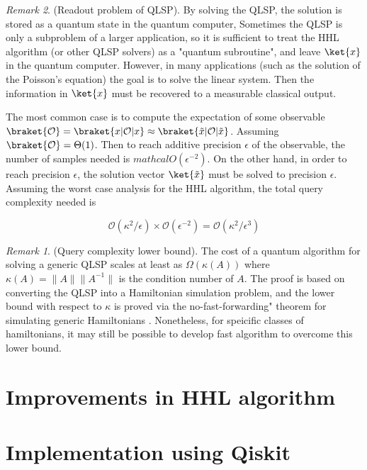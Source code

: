 \documentclass[12pt, oneside]{book}
\theoremstyle{definition}
\theoremstyle{definition}
\theoremstyle{remark}
\newtheorem*{remark}{Remark}
\begin{document}
\begin{remark}
    (Readout problem of QLSP). By solving the QLSP, the solution is stored as a quantum state in the quantum computer, Sometimes the QLSP is only a subproblem of a larger application, so it is sufficient to treat the HHL algorithm (or other QLSP solvers) as a "quantum subroutine", and leave $\ket{x}$ in the quantum computer. However, in many applications (such as the solution of the Poisson's equation) the goal is to solve the linear system. Then the information in $\ket{x}$ must be recovered to a measurable classical output.

    The most common case is to compute the expectation of some observable $\braket{\mathcal{O}}=\braket{x|\mathcal{O}|x}\approx \braket{\tilde{x}|\mathcal{O}|\tilde{x}}$. Assuming $\braket{\mathcal{O}}=\Theta(1)$. Then to reach additive precision $\epsilon$ of the observable, the number of samples needed is $mathcal{O}(\epsilon^{-2})$. On the other hand, in order to reach precision $\epsilon$, the solution vector $\ket{\tilde{x}}$ must be solved to precision $\epsilon$. Assuming the worst case analysis for the HHL algorithm, the total query complexity needed is
    
\[
\mathcal{O}(\kappa^2/\epsilon)\times \mathcal{O}(\epsilon^{-2})=\mathcal{O}(\kappa^2/\epsilon^3)
\]

\begin{remark}
    (Query complexity lower bound). The cost of a quantum algorithm for solving a generic QLSP scales at least as $\Omega(\kappa(A))$ where $\kappa(A)=\|A\|\|A^{-1}\|$ is the condition number of $A$. The proof is based on converting the QLSP into a Hamiltonian simulation problem, and the lower bound with respect to $\kappa$ is proved via the no-fast-forwarding" theorem for simulating generic Hamiltonians \cite{harrow2009quantum}. Nonetheless, for speicific classes of hamiltonians, it may still be possible to develop fast algorithm to overcome this lower bound.
\end{remark}

\end{remark}

\section{Improvements in HHL algorithm}

\section{Implementation using Qiskit}
\end{document}
